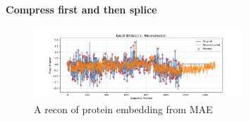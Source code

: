 \documentclass{article}
\begin{document}
%		
%		
%		
%		

	\paragraph{Compress first and then splice} 
	
	\begin{figure}[h]
		\centering
		\includegraphics[width=0.7\textwidth]{imgs/epoch60_batch1.png}
		\caption{A recon of protein embedding from MAE}
	\end{figure}
	
\end{document}

